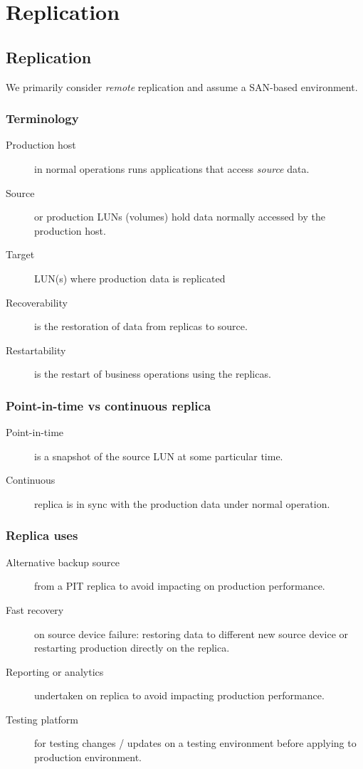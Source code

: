 \chapter{Replication}
\label{ch:replication}

\section{Replication}\label{replication}

We primarily consider \emph{remote} replication and assume a SAN-based
environment.

\subsection{Terminology}\label{terminology}

\begin{description}
\item[Production host]
in normal operations runs applications that access \emph{source} data.
\item[Source]
or production LUNs (volumes) hold data normally accessed by the
production host.
\item[Target]
LUN(s) where production data is replicated
\item[Recoverability]
is the restoration of data from replicas to source.
\item[Restartability]
is the restart of business operations using the replicas.
\end{description}

\subsection{Point-in-time vs continuous
replica}\label{point-in-time-vs-continuous-replica}

\begin{description}
\item[Point-in-time]
is a snapshot of the source LUN at some particular time.
\item[Continuous]
replica is in sync with the production data under normal operation.
\end{description}

\subsection{Replica uses}\label{replica-uses}

\begin{description}
\item[Alternative backup source]
from a PIT replica to avoid impacting on production performance.
\item[Fast recovery]
on source device failure: restoring data to different new source device
or restarting production directly on the replica.
\item[Reporting or analytics]
undertaken on replica to avoid impacting production performance.
\item[Testing platform]
for testing changes / updates on a testing environment before applying
to production environment.
\end{description}

